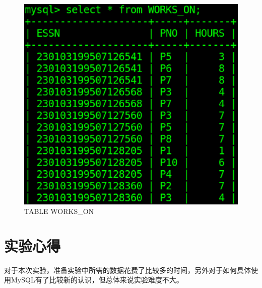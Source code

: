 \documentclass{ML}
\begin{document}
\begin{figure}[H]
    \centering
    \includegraphics[scale = 0.5, bb = 0 0 419 375]{media/works_ON.eps}
    \caption{TABLE WORKS\_ON}\label{fig:works_on}
\end{figure}


\section{实验心得}

对于本次实验，准备实验中所需的数据花费了比较多的时间，另外对于如何具体使用MySQL有了比较新的认识，但总体来说实验难度不大。


\end{document}

